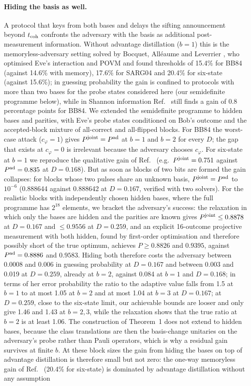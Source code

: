 \documentclass[aps,pra,twocolumn,superscriptaddress,nofootinbib]{revtex4-2}
\begin{document}
\paragraph*{Hiding the basis as well.} A protocol that keys from both bases and delays the sifting announcement beyond $t_{\rm coh}$ confronts the adversary with the basis as additional post-measurement information. Without advantage distillation ($b=1$) this is the memoryless-adversary setting solved by Bocquet, Alléaume and Leverrier \cite{BAL11}, who optimised Eve's interaction and POVM and found thresholds of 15.4\% for BB84 (against 14.6\% with memory), 17.6\% for SARG04 and 20.4\% for six-state (against 15.6\%); in guessing probability the gain is confined to protocols with more than two bases for the probe states considered here (our semidefinite programme below), while in Shannon information Ref.~\cite{BAL11} still finds a gain of 0.8 percentage points for BB84. We extended the semidefinite programme to hidden bases and parities, with Eve's probe states conditioned on Bob's outcome and the accepted-block mixture of all-correct and all-flipped blocks. For BB84 the worst-case attack ($c_\varphi=1$) gives $P^{\rm joint}=P^{\rm ad}$ at $b=1$ and $b=2$ for every $D$; the gap that exists at $c_\varphi=0$ is irrelevant because the adversary chooses $c_\varphi$. For six-state at $b=1$ we reproduce the qualitative gain of Ref.~\cite{BAL11} (e.g.\ $P^{\rm joint}=0.751$ against $P^{\rm ad}=0.835$ at $D=0.168$). But as soon as blocks of two bits are formed the gain collapses: for blocks whose two pulses share an unknown basis, $P^{\rm joint}=P^{\rm ad}$ to $10^{-6}$ (0.888644 against 0.888642 at $D=0.167$, verified with two solvers). For the realistic blocks with independently chosen hidden bases, where the full programme has $2^{18}$ elements, we bracket the adversary's success: the relaxation in which only the bases are hidden and the parities are known gives $P^{\rm joint}\le0.8878$ at $D=0.167$ and $\le0.9556$ at $D=0.259$, and an explicit 16-outcome projective measurement with both hidden, found by first-order optimisation and therefore possibly short of the true optimum, achieves $P\ge0.8826$ and $0.9395$, against $P^{\rm ad}=0.8886$ and $0.9583$. Hiding both therefore costs the adversary between 0.0008 and 0.006 in guessing probability at $D=0.167$ and between 0.003 and 0.019 at $D=0.259$, already at $b=2$, against 0.084 at $b=1$ and $D=0.168$; in terms of her error probability the ratio to the adaptive value falls from 1.5 at $b=1$ to at most 1.05 at $b=2$ and at most 1.04 at $b=3$ at $D=0.167$; at $D=0.259$, close to the six-state limit, our achievable bounds are looser and only give 1.46 and 1.43 at $b=2,3$, while the relaxation shows that the true ratio at $b=2$ is at least 1.06. The construction of Theorem~1 does not extend to hidden bases, because the class translations are then the basis-change unitaries on the adversary's probe rather than Pauli operators, which is why a residual gain survives at finite $b$. At these block sizes the gain from hiding the bases on top of advantage distillation is therefore small but not zero: the one-way memoryless gain of Ref.~\cite{BAL11} (20.4\% for six-state) is dominated by advantage distillation without any assumption 
\end{document}
